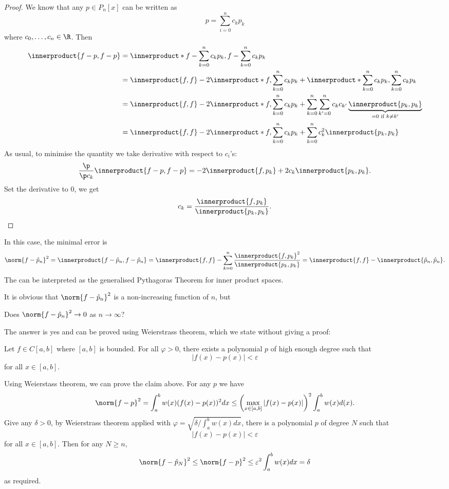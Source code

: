 \documentclass[a4paper]{article}
\newcommand*{\inner}{\innerproduct}
\begin{document}
\begin{proof}
  We know that any \(p \in P_n[x]\) can be written as
  \[
    p = \sum_{i = 0}^n c_kp_k
  \]
  where \(c_0, \dots, c_n \in \R\). Then
  \begin{align*}
    \inner{f - p, f - p} &= \inner*{f - \sum_{k = 0}^n c_kp_k, f - \sum_{k = 0}^n c_kp_k} \\
                         &= \inner{f, f} - 2\inner*{f, \sum_{k = 0}^n c_kp_k} + \inner*{\sum_{k = 0}^n c_kp_k, \sum_{k = 0}^n c_kp_k} \\
                         &= \inner{f, f} - 2\inner*{f, \sum_{k = 0}^n c_kp_k} + \sum_{k = 0}^n \sum_{k' = 0}^n c_kc_{k'}\underbrace{\inner{p_k, p_k}}_{= 0 \text{ if } k \neq k'} \\
                         &= \inner{f, f} - 2\inner*{f, \sum_{k = 0}^n c_kp_k} + \sum_{k = 0}^n c_k^2 \inner{p_k, p_k}
  \end{align*}
  As usual, to minimise the quantity we take derivative with respect to \(c_i\)'s:
  \[
    \frac{\p}{\p c_k} \inner{f - p, f - p} = -2 \inner{f, p_k}  + 2c_k \inner{p_k, p_k}.
  \]
  Set the derivative to \(0\), we get
  \[
    c_k = \frac{\inner{f, p_k}}{\inner{p_k, p_k}}.
  \]
\end{proof}

In this case, the minimal error is
\[
  \norm{f - \hat p_n}^2 = \inner{f - \hat p_n, f - \hat p_n} = \inner{f, f} - \sum_{k = 0}^n \frac{\inner{f, p_k}^2}{\inner{p_k, p_k}} = \inner{f, f} - \inner{\hat p_n, \hat p_n}.
\]
The can be interpreted as the generalised Pythagoras Theorem for inner product spaces.

It is obvious that \(\norm{f - \hat p_n}^2\) is a non-increasing function of \(n\), but
\begin{question}
  Does \(\norm{f - \hat p_n}^2 \to 0\) as \(n \to \infty\)?
\end{question}

The answer is yes and can be proved using Weierstrass theorem, which we state without giving a proof:

\begin{theorem}[Weierstrass]
  Let \(f \in C[a, b]\) where \([a, b]\) is bounded. For all \(\varphi > 0\), there exists a polynomial \(p\) of high enough degree such that
  \[
    |f(x) - p(x)| < \varepsilon
  \]
  for all \(x \in [a, b]\).
\end{theorem}

Using Weierstass theorem, we can prove the claim above. For any \(p\) we have
\[
  \norm{f - p}^2 = \int_a^b w(x)(f(x) - p(x))^2 dx \leq \left(\max_{x \in [a, b]} |f(x) - p(x)| \right)^2 \int_a^b w(x) d(x).
\]
Give any \(\delta > 0\), by Weierstrass theorem applied with \(\varphi = \sqrt{\delta/\int_a^b w(x) dx}\), there is a polynomial \(p\) of degree \(N\) such that
\[
  |f(x) - p(x)| < \varepsilon
\]
for all \(x \in [a, b]\). Then for any \(N \geq n\),
\[
  \norm{f - \hat p_N}^2 \leq \norm{f - p}^2 \leq \varepsilon^2 \int_a^b w(x) dx = \delta
\]
as required.
\end{document}
